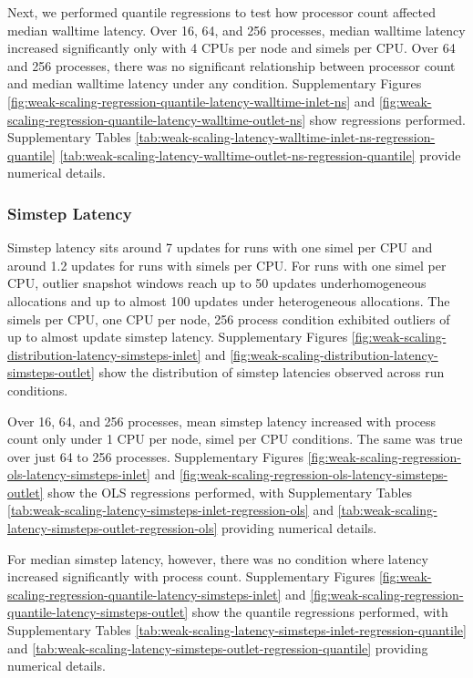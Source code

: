 Next, we performed quantile regressions to test how processor count affected median walltime latency.
Over 16, 64, and 256 processes, median walltime latency increased significantly only with 4 CPUs per node and  simels per CPU.
Over 64 and 256 processes, there was no significant relationship between processor count and median walltime latency under any condition.
Supplementary Figures \ref{fig:weak-scaling-regression-quantile-latency-walltime-inlet-ns} and \ref{fig:weak-scaling-regression-quantile-latency-walltime-outlet-ns} show regressions performed.
Supplementary Tables \ref{tab:weak-scaling-latency-walltime-inlet-ns-regression-quantile} \ref{tab:weak-scaling-latency-walltime-outlet-ns-regression-quantile} provide numerical details.

\subsubsection{Simstep Latency}

Simstep latency sits around 7 updates for runs with one simel per CPU and around 1.2 updates for runs with  simels per CPU.
For runs with one simel per CPU, outlier snapshot windows reach up to 50 updates underhomogeneous allocations and up to almost 100 updates under heterogeneous allocations.
The  simels per CPU, one CPU per node, 256 process condition exhibited outliers of up to almost  update simstep latency.
Supplementary Figures \ref{fig:weak-scaling-distribution-latency-simsteps-inlet} and \ref{fig:weak-scaling-distribution-latency-simsteps-outlet}  show the distribution of simstep latencies observed across run conditions.

Over 16, 64, and 256 processes, mean simstep latency increased with process count only under 1 CPU per node,  simel per CPU conditions.
The same was true over just 64 to 256 processes.
Supplementary Figures \ref{fig:weak-scaling-regression-ols-latency-simsteps-inlet} and \ref{fig:weak-scaling-regression-ols-latency-simsteps-outlet} show the OLS regressions performed, with
Supplementary Tables \ref{tab:weak-scaling-latency-simsteps-inlet-regression-ols} and \ref{tab:weak-scaling-latency-simsteps-outlet-regression-ols} providing numerical details.

For median simstep latency, however, there was no condition where latency increased significantly with process count.
Supplementary Figures \ref{fig:weak-scaling-regression-quantile-latency-simsteps-inlet} and \ref{fig:weak-scaling-regression-quantile-latency-simsteps-outlet} show the quantile regressions performed, with Supplementary Tables \ref{tab:weak-scaling-latency-simsteps-inlet-regression-quantile} and \ref{tab:weak-scaling-latency-simsteps-outlet-regression-quantile} providing numerical details.

